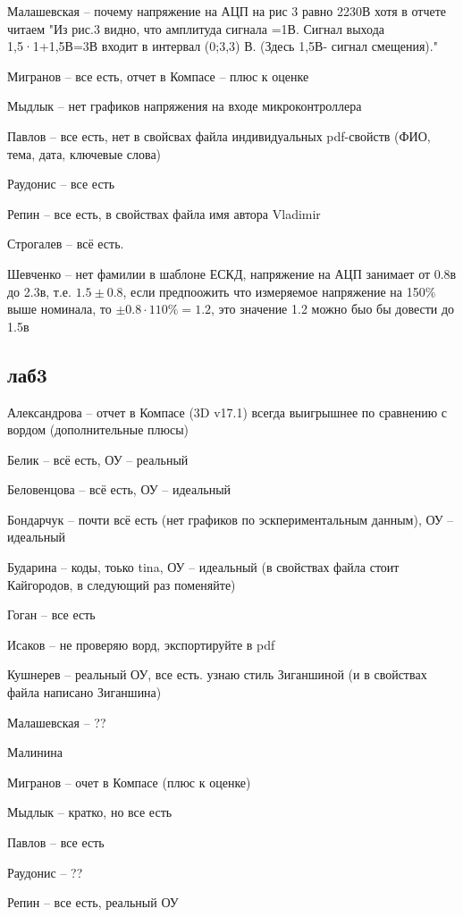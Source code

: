 \documentclass[a4paper,11pt]{article}
\begin{document}
Малашевская -- почему напряжение на АЦП на рис 3 равно 2230В хотя в отчете читаем "Из рис.3 видно, что амплитуда сигнала =1В. Сигнал выхода 1,5·1+1,5В=3В
входит в интервал (0;3,3) В. (Здесь 1,5В- сигнал смещения)."

Мигранов -- все есть, отчет в Компасе -- плюс к оценке

Мыдлык -- нет графиков напряжения на входе микроконтроллера

Павлов -- все есть, нет в свойсвах файла индивидуальных pdf-свойств (ФИО, тема, дата, ключевые слова)

Раудонис -- все есть

Репин -- все есть, в свойствах файла имя автора Vladimir

Строгалев -- всё есть.

Шевченко -- нет фамилии в шаблоне ЕСКД, напряжение на АЦП занимает от 0.8в до 2.3в, т.е. $1.5\pm0.8$, если предпоожить что измеряемое напряжение на 150\% выше
номинала, то $\pm0.8\cdot110\% = 1.2$, это значение 1.2 можно быо бы довести до 1.5в
\newpage
\subsection*{лаб3}
Александрова -- отчет в Компасе (3D v17.1) всегда выигрышнее по сравнению с вордом (дополнительные плюсы)

Белик -- всё есть, ОУ -- реальный

Беловенцова  -- всё есть, ОУ -- идеальный

Бондарчук -- почти всё есть (нет графиков по эскпериментальным данным), ОУ -- идеальный

Бударина -- коды, тоько tina, ОУ -- идеальный  (в свойствах файла стоит Кайгородов, в следующий раз поменяйте)

Гоган  -- все есть

Исаков -- не проверяю ворд, экспортируйте в pdf

Кушнерев -- реальный ОУ, все есть. узнаю стиль  Зиганшиной (и в свойствах файла написано Зиганшина)

Малашевская -- ?? %

Малинина 

Мигранов -- очет в Компасе (плюс к оценке)

Мыдлык -- кратко, но все есть

Павлов -- все есть

Раудонис -- ??

Репин -- все есть, реальный ОУ
\end{document}
